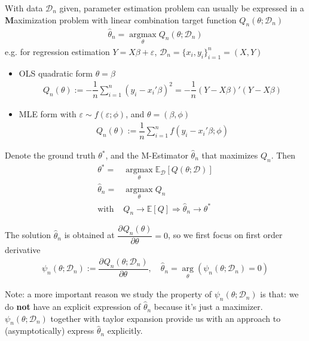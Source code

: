 With data $ \mathcal{D}_n $ given, parameter estimation problem can usually be expressed in a \textbf{M}aximization problem with linear combination target function $ Q_n(\theta ;\mathcal{D}_n) $ 
\begin{align}
    \hat{\theta }_n=\mathop{\arg\max}\limits_{\theta } Q_n(\theta;\mathcal{D}_n )
\end{align}
e.g. for regression estimation $ Y=X\beta + \varepsilon  $, $ \mathcal{D}_n=\{x_i,y_i\}_{i=1}^n=(X,Y) $
\begin{itemize}[topsep=2pt,itemsep=0pt]
    \item OLS quadratic form $ \theta = \beta $ 
    \begin{align}
        Q_n(\theta ) := -\dfrac{1}{n}\sum_{i=1}^n\left(y_i-x_i'\beta \right)^2=-\dfrac{1}{n}(Y-X\beta )'(Y-X\beta )
    \end{align}
    \item MLE form with $ \varepsilon \sim f(\varepsilon ; \phi ) $, and $ \theta =(\beta ,\phi ) $
    \begin{align}
        Q_n(\theta ) :=\dfrac{1}{n} \sum_{i=1}^nf\left(y_i-x_i'\beta ; \phi  \right)
    \end{align} 
\end{itemize}

    Denote the ground truth $ \theta ^* $, and the M-Estimator $ \hat{\theta }_n $ that maximizes $ Q_n $. Then
    \begin{align}
        \theta ^* =& \mathop{\arg\max}\limits_{\theta } \mathbb{E}_{\mathcal{D}}\left[ Q(\theta ; \mathcal{D}) \right]\\
        \hat{\theta }_n=&\mathop{\arg\max}\limits_{\theta } Q_n\\
        \text{with }&Q_n\to \mathbb{E}\left[ Q \right] \Rightarrow \hat{\theta }_n\to \theta ^*
    \end{align}

    The solution $ \hat{\theta }_n $ is obtained at $ \dfrac{\partial^{} Q_n(\theta )}{\partial \theta ^{}} =0$, so we first focus on first order derivative
    \begin{align}
        \psi_n(\theta;\mathcal{D}_n ) := \dfrac{\partial^{} Q_n(\theta;\mathcal{D}_n )}{\partial \theta ^{}},\quad \hat{\theta }_n=\mathop{\arg}\limits_{\theta }(\psi_n(\theta ;\mathcal{D}_n)=0 )
    \end{align}

    Note: a more important reason we study the property of $ \psi_n(\theta ;\mathcal{D}_n) $ is that: we do \textbf{not} have an explicit expression of $ \hat{\theta }_n$ because it's just a maximizer. $ \psi_n(\theta ;\mathcal{D}_n) $ together with taylor expansion provide us with an approach to (asymptotically) express $ \hat{\theta }_n $ explicitly.

